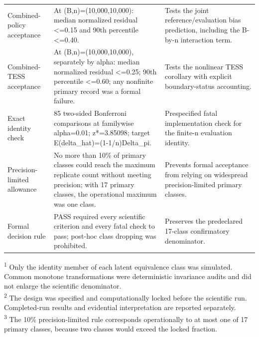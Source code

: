 \begin{table}[htbp]
\begin{tabularx}{\textwidth}{p{} X X}
Combined-policy acceptance & At (B,n)=(10,000,10,000): median normalized residual <=0.15 and 90th percentile <=0.40. & Tests the joint reference/evaluation bias prediction, including the B-by-n interaction term. \\
Combined-TESS acceptance & At (B,n)=(10,000,10,000), separately by alpha: median normalized residual <=0.25; 90th percentile <=0.60; any nonfinite primary record was a formal failure. & Tests the nonlinear TESS corollary with explicit boundary-status accounting. \\
Exact identity check & 85 two-sided Bonferroni comparisons at familywise alpha=0.01; z*=3.85098; target E(delta\_hat)=(1-1/n)Delta\_pi. & Prespecified fatal implementation check for the finite-n evaluation identity. \\
Precision-limited allowance & No more than 10\% of primary classes could reach the maximum replicate count without meeting precision; with 17 primary classes, the operational maximum was one class. & Prevents formal acceptance from relying on widespread precision-limited primary classes. \\
Formal decision rule & PASS required every scientific criterion and every fatal check to pass; post-hoc class dropping was prohibited. & Preserves the predeclared 17-class confirmatory denominator. \\
\bottomrule
\end{tabularx}
\begin{minipage}{\textwidth}
\footnotesize
\textsuperscript{1} Only the identity member of each latent equivalence class was simulated. Common monotone transformations were deterministic invariance audits and did not enlarge the scientific denominator.\\
\textsuperscript{2} The design was specified and computationally locked before the scientific run. Completed-run results and evidential interpretation are reported separately.\\
\textsuperscript{3} The 10\% precision-limited rule corresponds operationally to at most one of 17 primary classes, because two classes would exceed the locked fraction.\\
\end{minipage}
\end{table}

